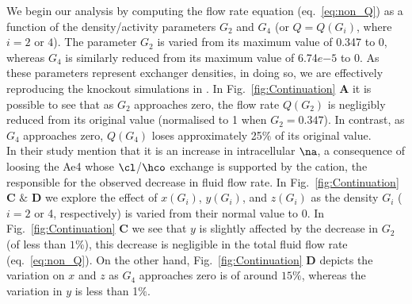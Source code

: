 We begin our analysis by computing the flow rate equation (eq.~\ref{eq:non_Q}) as a function of the density/activity parameters $G_2$ and $G_4$ (or $Q = Q(G_i)$, where $i=2$ or $4$). The parameter $G_2$ is varied from its maximum value of 0.347 to 0, whereas $G_4$ is similarly reduced from its maximum value of 6.74$e{-5}$ to 0. As these parameters represent exchanger densities, in doing so, we are effectively reproducing the knockout simulations in \cite{siguenza2017Ae4}. In Fig.~\ref{fig:Continuation} \textbf{A} it is possible to see that as $G_2$ approaches zero, the flow rate $Q(G_2)$ is negligibly reduced from its original value (normalised to 1 when $G_2=0.347$). In contrast, as $G_4$ approaches zero, $Q(G_4)$ loses approximately 25$\%$ of its original value.\\

In their study \cite{siguenza2017Ae4} mention that it is an increase in intracellular $\na$, a consequence of loosing the Ae4 whose $\cl$/$\hco$ exchange is supported by the cation, the responsible for the observed decrease in fluid flow rate. In Fig.~\ref{fig:Continuation} \textbf{C} $\&$ \textbf{D} we explore the effect of $x(G_i)$, $y(G_i)$, and $z(G_i)$ as the density $G_i$ ($i = 2$ or 4, respectively) is varied from their normal value to 0.  In Fig.~\ref{fig:Continuation} \textbf{C} we see that $y$ is slightly affected by the decrease in $G_2$ (of less than $1\%$), this decrease is negligible in the total fluid flow rate (eq.~\ref{eq:non_Q}). On the other hand, Fig.~\ref{fig:Continuation} \textbf{D} depicts the variation on $x$ and $z$ as $G_4$ approaches zero is of around $15\%$, whereas the variation in $y$ is less than 1$\%$.\\

